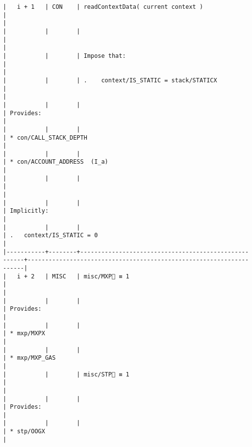 \documentclass[varwidth=\maxdimen,margin=0.5cm,multi={verbatim}]{standalone}
\begin{document}
\begin{verbatim}
|   i + 1   | CON    | readContextData( current context )                   |                                                                     |
|           |        |                                                      |                                                                     |
|           |        | Impose that:                                         |                                                                     |
|           |        | .    context/IS_STATIC = stack/STATICX               |                                                                     |
|           |        |                                                      | Provides:                                                           |
|           |        |                                                      | * con/CALL_STACK_DEPTH                                              |
|           |        |                                                      | * con/ACCOUNT_ADDRESS  (I_a)                                        |
|           |        |                                                      |                                                                     |
|           |        |                                                      | Implicitly:                                                         |
|           |        |                                                      | .   context/IS_STATIC = 0                                           |
|-----------+--------+------------------------------------------------------+---------------------------------------------------------------------|
|   i + 2   | MISC   | misc/MXP🚩 ≡ 1                                       |                                                                     |
|           |        |                                                      | Provides:                                                           |
|           |        |                                                      | * mxp/MXPX                                                          |
|           |        |                                                      | * mxp/MXP_GAS                                                       |
|           |        | misc/STP🚩 ≡ 1                                       |                                                                     |
|           |        |                                                      | Provides:                                                           |
|           |        |                                                      | * stp/OOGX                                                          |

\end{verbatim}
\end{document}
